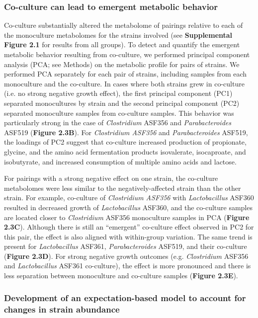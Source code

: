 \documentclass[11pt,twocolumn,notitlepage,openany,twoside]{book}
\begin{document}
\begin{refsection}
\subsubsection{Co-culture can lead to emergent metabolic behavior}

Co-culture substantially altered the metabolome of pairings relative to each of the monoculture metabolomes for the strains involved (see \textbf{Supplemental Figure 2.1} for results from all groups). To detect and quantify the emergent metabolic behavior resulting from co-culture, we performed principal component analysis (PCA; see Methods) on the metabolic profile for pairs of strains. We performed PCA separately for each pair of strains, including samples from each monoculture and the co-culture. In cases where both strains grew in co-culture (i.e. no strong negative growth effect), the first principal component (PC1) separated monocultures by strain and the second principal component (PC2) separated monoculture samples from co-culture samples. This behavior was particularly strong in the case of \textit{Clostridium} ASF356 and \textit{Parabacteroides} ASF519 (\textbf{Figure 2.3B}). For \textit{Clostridium ASF356} and \textit{Parabacteroides} ASF519, the loadings of PC2 suggest that co-culture increased production of propionate, glycine, and the amino acid fermentation products isovalerate, isocaproate, and isobutyrate, and increased consumption of multiple amino acids and lactose.

For pairings with a strong negative effect on one strain, the co-culture metabolomes were less similar to the negatively-affected strain than the other strain. For example, co-culture of \textit{Clostridium ASF356} with \textit{Lactobacillus} ASF360 resulted in decreased growth of \textit{Lactobacillus} ASF360, and the co-culture samples are located closer to \textit{Clostridium} ASF356 monoculture samples in PCA (\textbf{Figure 2.3C}). Although there is still an “emergent” co-culture effect observed in PC2 for this pair, the effect is also aligned with within-group variation. The same trend is present for \textit{Lactobacillus} ASF361, \textit{Parabacteroides} ASF519, and their co-culture (\textbf{Figure 2.3D}). For strong negative growth outcomes (e.g. \textit{Clostridium} ASF356 and \textit{Lactobacillus} ASF361 co-culture), the effect is more pronounced and there is less separation between monoculture and co-culture samples (\textbf{Figure 2.3E}).

\subsubsection{Development of an expectation-based model to account for changes in strain abundance}


\end{refsection}
\end{document}
